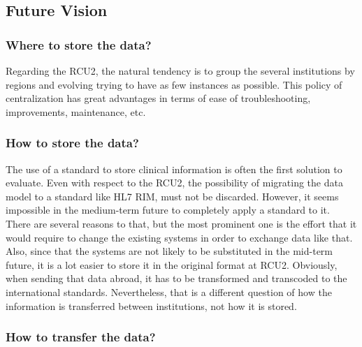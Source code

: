 

\subsection{Future Vision}

\subsubsection{Where to store the data?}

Regarding the RCU2, the natural tendency is to group the several institutions by regions and evolving trying to have as few instances as possible. This policy of centralization has great advantages in terms of ease of troubleshooting, improvements, maintenance, etc. 


\subsubsection{How to store the data?}

The use of a standard to store clinical information is often the first solution to evaluate. Even with respect to the RCU2, the possibility of migrating the data model to a standard like HL7 RIM, must not be discarded. However, it seems impossible in the medium-term future to completely apply a standard to it. There are several reasons to that, but the most prominent one is the effort that it would require to change the existing systems in order to exchange data like that.
Also, since that the systems are not likely to be substituted in the mid-term future, it is a lot easier to store it in the original format at RCU2. Obviously, when sending that data abroad, it has to be transformed and transcoded to the international standards. Nevertheless, that is a different question of how the information is transferred between institutions, not how it is stored. 


\subsubsection{How to transfer the data?}

